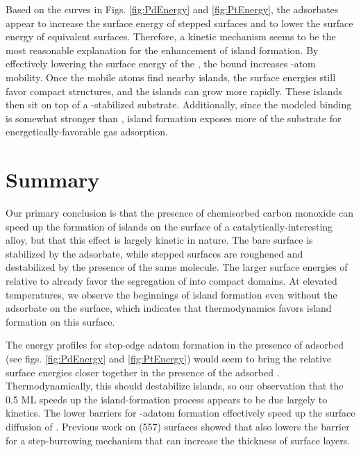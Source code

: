 \documentclass[journal = jpccck, manuscript = article]{achemso}
\begin{document}
Based on the curves in Figs. \ref{fig:PdEnergy} and
\ref{fig:PtEnergy}, the  adsorbates appear to increase the
surface energy of stepped  surfaces and to lower the surface
energy of equivalent  surfaces.  Therefore, a kinetic mechanism
seems to be the most reasonable explanation for the enhancement of island
formation.  By effectively lowering the surface energy of the ,
the bound  increases -atom mobility.  Once the mobile
 atoms find nearby islands, the surface energies still favor
compact structures, and the islands can grow more rapidly. These
islands then sit on top of a -stabilized  substrate.
Additionally, since the modeled  binding is somewhat
stronger than , island formation exposes more of the
 substrate for energetically-favorable gas adsorption.

\section{Summary}

Our primary conclusion is that the presence of chemisorbed carbon
monoxide can speed up the formation of  islands on the surface
of a catalytically-interesting alloy, but that this effect is largely
kinetic in nature.  The bare  surface is stabilized by the
 adsorbate, while stepped  surfaces are roughened and
destabilized by the presence of the same molecule. The larger surface
energies of  relative to  already favor the segregation
of  into compact domains.  At elevated temperatures, we observe
the beginnings of island formation even without the  adsorbate
on the surface, which indicates that thermodynamics favors island
formation on this surface.

The energy profiles for step-edge adatom formation in the presence of
adsorbed  (see figs. \ref{fig:PdEnergy} and \ref{fig:PtEnergy})
would seem to bring the relative surface energies closer together in
the presence of the adsorbed . Thermodynamically, this should
destabilize  islands, so our observation that the 0.5 ML
 speeds up the island-formation process appears to be due
largely to kinetics.  The lower barriers for -adatom formation
effectively speed up the surface diffusion of .  Previous work
on (557) surfaces showed that  also lowers the barrier
for a step-burrowing mechanism that can increase the thickness of
 surface layers.\cite{Michalka:2013}
\end{document}
